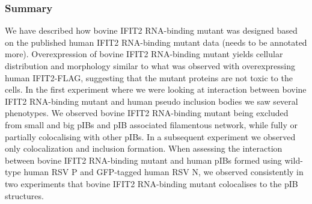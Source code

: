 \subsubsection{Summary}
We have described how bovine IFIT2 RNA-binding mutant was designed based on the published human IFIT2 RNA-binding mutant data (needs to be annotated more). Overexpression of bovine IFIT2 RNA-binding mutant yields cellular distribution and morphology similar to what was observed with overexpressing human IFIT2-FLAG, suggesting that the mutant proteins are not toxic to the cells. In the first experiment where we were looking at interaction between bovine IFIT2 RNA-binding mutant and human pseudo inclusion bodies we saw several phenotypes. We observed bovine IFIT2 RNA-binding mutant being excluded from small and big pIBs and pIB associated filamentous network, while fully or partially colocalising with other pIBs. In a subsequent experiment we observed only colocalization and inclusion formation. When assessing the interaction between bovine IFIT2 RNA-binding mutant and human pIBs formed using wild-type human RSV P and GFP-tagged human RSV N, we observed consistently in two experiments that bovine IFIT2 RNA-binding mutant colocalises to the pIB structures.